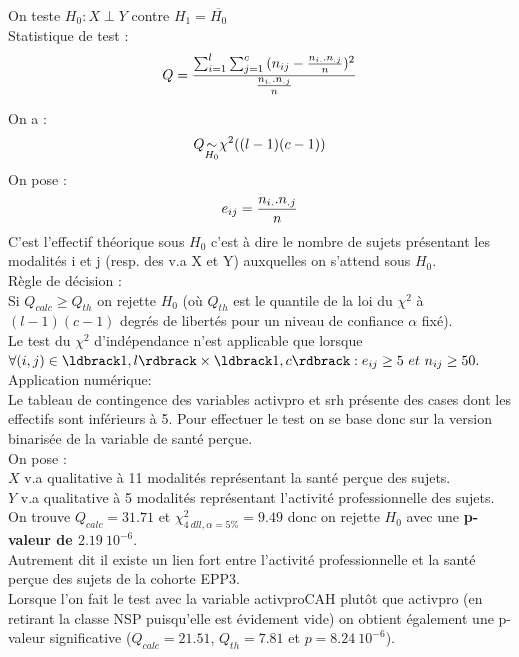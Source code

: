 \documentclass{book}
\begin{document}
\noindent
On teste $H_0 : X \perp Y $ contre $H_1 = \overline{H_0}$\\

\noindent
Statistique de test : 
\begin{equation}
Q = {\sum _{i = 1} ^l \sum_{j = 1} ^c {{(n_{ij} - {{n_{i.}.n_{.j}}\over{n}})^2}} \over {{n_{i.}.n_{.j}}\over{n}}}
\end{equation}

\noindent
On a : \\
\begin{equation}
Q \underset {\small{H_0}}{\large{\sim}} \chi ^{2} ((l-1)(c-1))
\end{equation}
\noindent
On pose :\\
\begin{equation}
e_{ij} = { {n_{i.}.n_ {.j} } \over {n} }
\end{equation}
C'est l'effectif théorique sous $H_0$ c'est à dire le nombre de sujets présentant les modalités i et j (resp. des v.a X et Y) auxquelles on s'attend sous $H_0$.\\

\noindent
Règle de décision :\\
Si $Q_{calc} \geq Q_{th}$ on rejette $H_0$ (où $Q_{th}$ est le quantile de la loi du $\chi ^2$ à $(l-1)(c-1)$ degrés de libertés pour un niveau de confiance $\alpha$ fixé).\\

\noindent
Le test du $\chi ^2$ d'indépendance n'est applicable que lorsque $\forall (i,j) \in \ldbrack 1,l \rdbrack \times \ldbrack 1,c \rdbrack : e_{ij} \geq 5 ~et ~n_{ij} \geq 50.$\\

\noindent
Application numérique:\\
Le tableau de contingence des variables activpro et srh présente des cases dont les effectifs sont inférieurs à 5. Pour effectuer le test on se base donc sur la version binarisée de la variable de santé perçue.\\

\noindent
On pose :\\
\noindent
$X$ v.a qualitative à 11 modalités représentant la santé perçue des sujets.\\
\noindent
$Y$ v.a qualitative à 5 modalités représentant l'activité professionnelle des sujets.\\

\noindent
On trouve $Q_{calc} = 31.71$ et $\chi ^2 _ {4 ~dll, \alpha = 5 \%} = 9.49$ donc on rejette $H_0$ avec une \textbf{p-valeur de $2.19 ~10^{-6}$}.\\
Autrement dit il existe un lien fort entre l'activité professionnelle et la santé perçue des sujets de la cohorte EPP3.\\
\noindent
Lorsque l'on fait le test avec la variable activproCAH plutôt que activpro (en retirant la classe NSP puisqu'elle est évidement vide) on obtient également une p-valeur significative ($Q_{calc} = 21.51$, $Q_{th} = 7.81$ et $p= 8.24 ~10^{-6}$).
\end{document}
